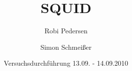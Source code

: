 \documentclass[a4paper,oneside]{scrartcl} %
\title{SQUID}
\author{Robi Pedersen \and Simon Schmeißer}
\date{Versuchsdurchführung 13.09. - 14.09.2010}
\begin{document}
\begin{titlepage}
  \maketitle
  \vfill
  \thispagestyle{empty}
\end{titlepage}

\tableofcontents
\clearpage







\clearpage

% 
%
\end{document}
